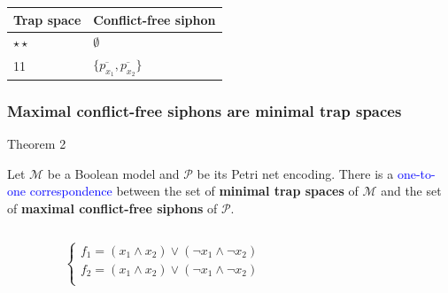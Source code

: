 \documentclass{beamer}              %
\newcommand{\blue}[1]{\textcolor{blue}{#1}}
\begin{document}
\begin{frame}
\begin{columns}
\begin{column}{0.6\textwidth}
{
        }
    \end{column}
\end{columns}

\begin{tabular}{ll}
  \toprule
  Trap space & Conflict-free siphon \\ \midrule
  \(\star\star\) & \(\emptyset\) \\
  11 & \(\{\overline{p_{x_1}}, \overline{p_{x_2}}\}\) \\
  \bottomrule
\end{tabular}

\end{frame}

\begin{frame}
\frametitle{Maximal conflict-free siphons are minimal trap spaces}

\begin{block}{Theorem 2}

  Let \(\mathcal{M}\) be a Boolean model and \(\mathcal{P}\) be its Petri net encoding. There is a \blue{one-to-one correspondence} between the set of \textbf{minimal trap spaces} of \(\mathcal{M}\) and the set of \textbf{maximal conflict-free siphons} of \(\mathcal{P}\).
  
\end{block}

\begin{columns}
  \begin{column}{0.4\textwidth}
    \begin{equation*}
      \begin{cases}
        f_1 = (x_1 \land x_2) \lor (\neg x_1 \land \neg x_2)\\
        f_2 = (x_1 \land x_2) \lor (\neg x_1 \land \neg x_2)\\
      \end{cases}
    \end{equation*}
  \end{column}
    \begin{column}{0.6\textwidth}
    \centering
\end{column}
\end{columns}
\end{frame}
\end{document}
